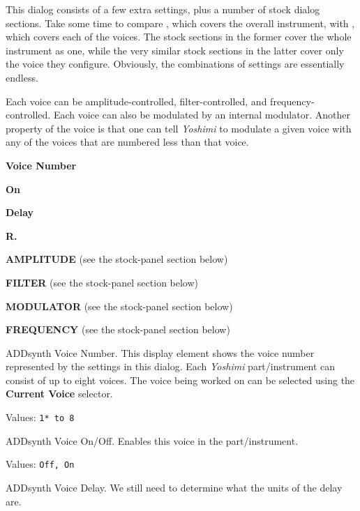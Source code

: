    This dialog consists of a few extra settings, plus a number of
   stock dialog sections.  Take some time to compare
   ,
   which covers the overall instrument, with 
   ,
   which covers each of the voices.
   The stock sections in the former cover the whole instrument as one,
   while the very similar stock sections in the latter cover only the
   voice they configure.
   Obviously, the combinations of settings are essentially endless.

   Each voice can be amplitude-controlled, filter-controlled, and
   frequency-controlled.  Each voice can also be modulated by an
   internal modulator.
   Another property of the voice is that one can tell \textsl{Yoshimi}
   to modulate a given voice with any of the voices that are numbered less
   than that voice.

   \begin{enumber}
      \item \textbf{Voice Number}
      \item \textbf{On}
      \item \textbf{Delay}
      \item \textbf{R.}
      \item \textbf{AMPLITUDE} (see the stock-panel section below)
      \item \textbf{FILTER} (see the stock-panel section below)
      \item \textbf{MODULATOR} (see the stock-panel section below)
      \item \textbf{FREQUENCY} (see the stock-panel section below)
   \end{enumber}

   \setcounter{ItemCounter}{0}      %

   ADDsynth Voice Number.
   This display element shows the voice number represented by the settings
   in this dialog.  Each \textsl{Yoshimi} part/instrument can consist of up
   to eight voices.
   The voice being worked on can be selected using the
   \textbf{Current Voice} selector.

   Values: \texttt{1* to 8}

   ADDsynth Voice On/Off.
   Enables this voice in the part/instrument.

   Values: \texttt{Off, On}

   ADDsynth Voice Delay.
   We still need to determine what the units of the delay are.

